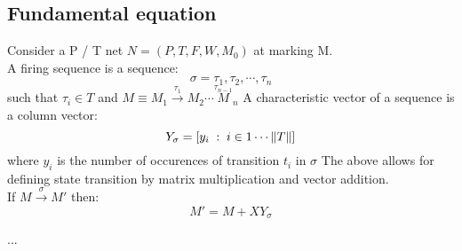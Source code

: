 \subsection{Fundamental equation}
Consider a P / T net $N = (P,T,F,W,M_0)$ at marking M.\\
{
 A firing sequence is a sequence:
 \begin{equation}
     \sigma = \tau_1,\tau_2,\cdots ,\tau_n
 \end{equation}
 such that $\tau_i \in T$ and $M \equiv M_1\overset{\tau_1}{\rightarrow}M_2 \cdots \overset{\tau_{n-1}}M_n$
}
{
    A characteristic vector of a sequence is a column vector:
    \begin{equation}
        Y_{\sigma} = [y_i \; : \; i\in 1 \cdots \lVert T\rVert]
    \end{equation}
    where $y_i$ is the number of occurences of transition  $t_i$ in $\sigma$
}
The above allows for defining state transition by matrix multiplication and vector addition.\\
{
    If $M \overset{\sigma}{\rightarrow} M'$ then:
     \begin{equation}
         M' = M + X Y_{\sigma}
    \end{equation}
}


{...}

